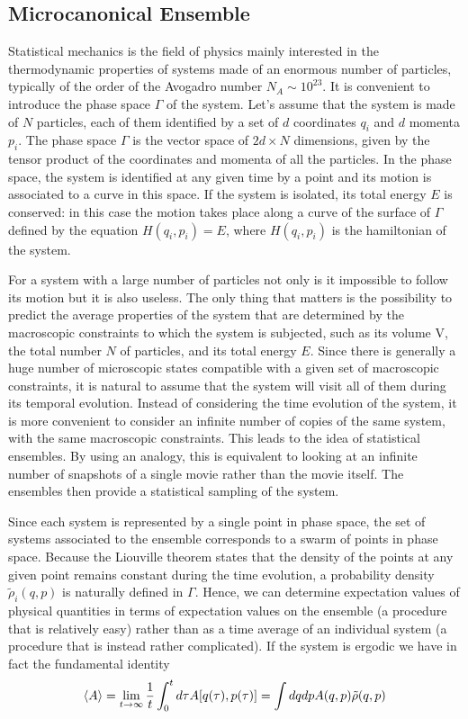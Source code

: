 \documentclass[10pt]{article}
\begin{document}
	\subsection{Microcanonical Ensemble}\label{Microcanonical Ensemble}
	Statistical mechanics is the field of physics mainly interested in the thermodynamic properties of systems made of an enormous number of particles, typically of the order of the Avogadro number $N_A\sim 10^{23}$. It is convenient to introduce the phase space $\Gamma$ of the system. Let's assume that the system is made of $N$ particles, each of them identified by a set of $d$ coordinates $q_i$ and $d$ momenta $p_i$. The phase space $\Gamma$ is the vector space of $2d\times N$ dimensions, given by the tensor product of the coordinates and momenta of all the particles. In the phase space, the system is identified at any given time by a point and its motion is associated to a curve in this space. If the system is isolated, its total energy $E$ is conserved: in this case the motion takes place along a curve of the surface of $\Gamma$ defined by the equation $H(q_i,p_i)=E$, where $H(q_i,p_i)$ is the hamiltonian of the system.  
	
	For a system with a large number of particles not only is it impossible to follow its motion but it is also useless. The only thing that matters is the possibility to predict the average properties of the system that are determined by the macroscopic constraints to which the system is subjected, such as its volume V, the total number $N$ of particles, and its total energy $E$. Since there is generally a huge number of microscopic states compatible with a given set of macroscopic constraints, it is natural to assume that the system will visit all of them during its temporal evolution. Instead of considering the time evolution of the system, it is more convenient to consider an infinite number of copies of the same system, with the same macroscopic constraints. This leads to the idea of statistical ensembles. By using an analogy, this is equivalent to looking at an infinite number of snapshots of a single movie rather than the movie itself. The ensembles then provide a statistical sampling of the system.
	
	Since each system is represented by a single point in phase space, the set of systems associated to the ensemble corresponds to a swarm of points in phase space. Because the Liouville theorem states that the density of the points at any given point remains constant during the time evolution, a probability density $\tilde{\rho}_i(q,p)$ is naturally defined in $\Gamma$. Hence, we can determine expectation values of physical quantities in terms of expectation values on the ensemble (a procedure that is relatively easy) rather than as a time average of an individual system (a procedure that is instead rather complicated). If the system is ergodic we have in fact the fundamental identity $$\expval{A}=\lim_{t\rightarrow \infty} \frac{1}{t}\int_0^td\tau A[q(\tau),p(\tau)]=\int dq dp A(q,p) \tilde{\rho}(q,p)$$
	
\end{document}
